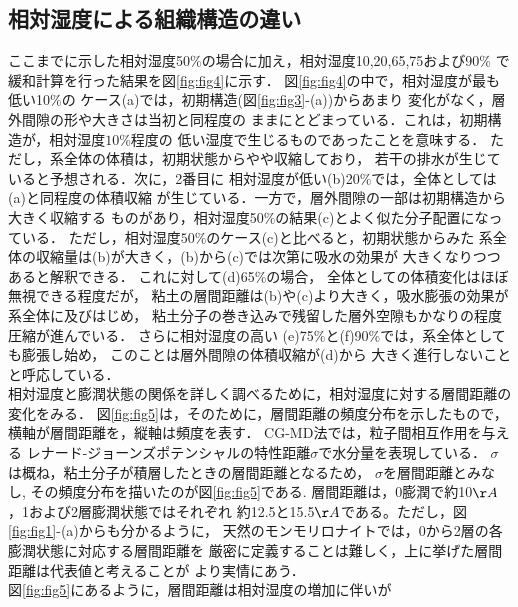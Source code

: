 \subsection{相対湿度による組織構造の違い}
ここまでに示した相対湿度50$\%$の場合に加え，相対湿度10,20,65,75および90$\%$
で緩和計算を行った結果を図\ref{fig:fig4}に示す．
図\ref{fig:fig4}の中で，相対湿度が最も低い10$\%$の
ケース(a)では，初期構造(図\ref{fig:fig3}-(a))からあまり
変化がなく，層外間隙の形や大きさは当初と同程度の
ままにとどまっている．これは，初期構造が，相対湿度$10\%$程度の
低い湿度で生じるものであったことを意味する．
ただし，系全体の体積は，初期状態からやや収縮しており，
若干の排水が生じていると予想される．次に，2番目に
相対湿度が低い(b)20$\%$では，全体としては(a)と同程度の体積収縮
が生じている．一方で，層外間隙の一部は初期構造から大きく収縮する
ものがあり，相対湿度50$\%$の結果(c)とよく似た分子配置になっている．
ただし，相対湿度$50\%$のケース(c)と比べると，初期状態からみた
系全体の収縮量は(b)が大きく，(b)から(c)では次第に吸水の効果が
大きくなりつつあると解釈できる．
これに対して(d)65$\%$の場合，
全体としての体積変化はほぼ無視できる程度だが，
粘土の層間距離は(b)や(c)より大きく，吸水膨張の効果が系全体に及びはじめ，
粘土分子の巻き込みで残留した層外空隙もかなりの程度圧縮が進んでいる．
さらに相対湿度の高い
(e)75$\%$と(f)90$\%$では，系全体としても膨張し始め，
このことは層外間隙の体積収縮が(d)から
大きく進行しないことと呼応している．\\
\hspace{\parindent}
相対湿度と膨潤状態の関係を詳しく調べるために，相対湿度に対する層間距離の変化をみる．
図\ref{fig:fig5}は，そのために，層間距離の頻度分布を示したもので，
横軸が層間距離を，縦軸は頻度を表す． CG-MD法では，粒子間相互作用を与える
レナード-ジョーンズポテンシャルの特性距離$\sigma$で水分量を表現している．
$\sigma$は概ね，粘土分子が積層したときの層間距離となるため，
$\sigma$を層間距離とみなし, その頻度分布を描いたのが図\ref{fig:fig5}である.
層間距離は，0膨潤で約10$\AA$，1および2層膨潤状態ではそれぞれ
約12.5と15.5$\AA$である。ただし，図\ref{fig:fig1}-(a)からも分かるように，
天然のモンモリロナイトでは，0から2層の各膨潤状態に対応する層間距離を
厳密に定義することは難しく，上に挙げた層間距離は代表値と考えることが
より実情にあう．\\
\hspace{\parindent}
図\ref{fig:fig5}にあるように，層間距離は相対湿度の増加に伴いが
